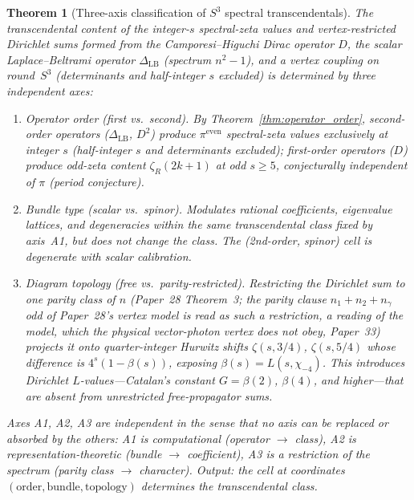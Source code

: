 \documentclass[aps,pra,twocolumn,superscriptaddress,longbibliography]{revtex4-2}
\newtheorem{theorem}{Theorem}
\begin{document}
\begin{theorem}[Three-axis classification of $S^3$ spectral
transcendentals]
\label{thm:three_axis}
The transcendental content of the integer-$s$ spectral-zeta values and
vertex-restricted Dirichlet sums formed from the Camporesi--Higuchi
Dirac operator $D$, the scalar Laplace--Beltrami operator $\Delta_{\mathrm{LB}}$ (spectrum $n^2 - 1$),
and a vertex coupling on round~$S^3$ (determinants and half-integer $s$
excluded) is determined by three independent axes:
\begin{enumerate}
\item[(A1)] \emph{Operator order} (first vs.\ second).
By Theorem~\ref{thm:operator_order}, second-order operators
($\Delta_{\mathrm{LB}}$, $D^2$) produce $\pi^{\mathrm{even}}$
spectral-zeta values exclusively at integer $s$ (half-integer $s$ and
determinants excluded); first-order operators ($D$) produce odd-zeta
content $\zeta_R(2k{+}1)$ at odd $s \ge 5$, conjecturally independent of
$\pi$ (period conjecture).
\item[(A2)] \emph{Bundle type} (scalar vs.\ spinor).
Modulates rational coefficients, eigenvalue lattices, and
degeneracies within the same transcendental class fixed by
axis~A1, but does not change the class.  The (2nd-order, spinor)
cell is degenerate with scalar calibration.
\item[(A3)] \emph{Diagram topology} (free vs.\ parity-restricted).
Restricting the Dirichlet sum to one parity class of $n$ (Paper~28
Theorem~3; the parity clause $n_1 + n_2 + n_\gamma$ odd of Paper~28's
vertex model is read as such a restriction, a reading of the model,
which the physical vector-photon vertex does not obey, Paper~33)
projects it onto
quarter-integer Hurwitz shifts $\zeta(s, 3/4)$, $\zeta(s, 5/4)$
whose difference is $4^s(1 - \beta(s))$, exposing
$\beta(s) = L(s, \chi_{-4})$.  This
introduces Dirichlet $L$-values---Catalan's constant
$G = \beta(2)$, $\beta(4)$, and higher---that are absent from
unrestricted free-propagator sums.
\end{enumerate}
Axes A1, A2, A3 are independent in the sense that no axis can be
replaced or absorbed by the others: A1 is computational (operator
$\to$ class), A2 is representation-theoretic (bundle $\to$
coefficient), A3 is a restriction of the spectrum (parity class
$\to$ character).  Output: the cell at coordinates
$(\mathrm{order}, \mathrm{bundle}, \mathrm{topology})$ determines
the transcendental class.
\end{theorem}
\end{document}
